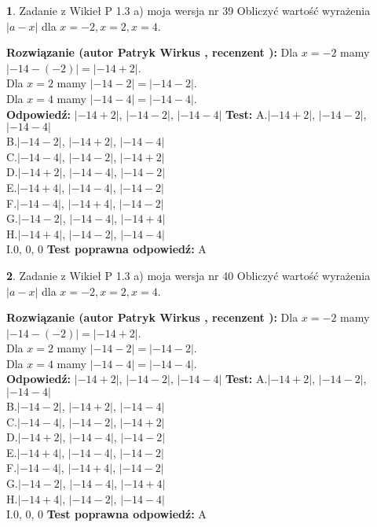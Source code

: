 \documentclass[12pt, a4paper]{article}
\theoremstyle{definition} %
\newtheorem{zad}{}
\newcommand{\zadStart}[1]{\begin{zad}#1\newline}
\newcommand{\zadStop}{\end{zad}}
\newcommand{\rozwStart}[2]{\noindent \textbf{Rozwiązanie (autor #1 , recenzent #2): }\newline}
\newcommand{\rozwStop}{\newline}
\newcommand{\odpStart}{\noindent \textbf{Odpowiedź:}\newline}
\newcommand{\odpStop}{\newline}
\newcommand{\testStart}{\noindent \textbf{Test:}\newline}
\newcommand{\testStop}{\newline}
\newcommand{\kluczStart}{\noindent \textbf{Test poprawna odpowiedź:}\newline}
\newcommand{\kluczStop}{\newline}
\begin{document}
\zadStart{Zadanie z Wikieł P 1.3 a) moja wersja nr 39}
Obliczyć wartość wyrażenia $|a - x|$ dla $x=-2,x=2,x=4$.
\zadStop
\rozwStart{Patryk Wirkus}{}
Dla $x = -2$ mamy $|-14 - (-2)| = |-14 + 2|$.\\
Dla $x = 2$ mamy $|-14 - 2| = |-14 - 2|$.\\
Dla $x = 4$ mamy $|-14 - 4| = |-14 - 4|$.\\
\rozwStop
\odpStart
$|-14 + 2|$, $|-14 - 2|$, $|-14 - 4|$
\odpStop
\testStart
A.$|-14 + 2|$, $|-14 - 2|$, $|-14 - 4|$\\
B.$|-14 - 2|$, $|-14 + 2|$, $|-14 - 4|$\\
C.$|-14 - 4|$, $|-14 - 2|$, $|-14 + 2|$\\
D.$|-14 + 2|$, $|-14 - 4|$, $|-14 - 2|$\\
E.$|-14 + 4|$, $|-14 - 4|$, $|-14 - 2|$\\
F.$|-14 - 4|$, $|-14 + 4|$, $|-14 - 2|$\\
G.$|-14 - 2|$, $|-14 - 4|$, $|-14 + 4|$\\
H.$|-14 + 4|$, $|-14 - 2|$, $|-14 - 4|$\\
I.$0$, $0$, $0$
\testStop
\kluczStart
A
\kluczStop



\zadStart{Zadanie z Wikieł P 1.3 a) moja wersja nr 40}
Obliczyć wartość wyrażenia $|a - x|$ dla $x=-2,x=2,x=4$.
\zadStop
\rozwStart{Patryk Wirkus}{}
Dla $x = -2$ mamy $|-14 - (-2)| = |-14 + 2|$.\\
Dla $x = 2$ mamy $|-14 - 2| = |-14 - 2|$.\\
Dla $x = 4$ mamy $|-14 - 4| = |-14 - 4|$.\\
\rozwStop
\odpStart
$|-14 + 2|$, $|-14 - 2|$, $|-14 - 4|$
\odpStop
\testStart
A.$|-14 + 2|$, $|-14 - 2|$, $|-14 - 4|$\\
B.$|-14 - 2|$, $|-14 + 2|$, $|-14 - 4|$\\
C.$|-14 - 4|$, $|-14 - 2|$, $|-14 + 2|$\\
D.$|-14 + 2|$, $|-14 - 4|$, $|-14 - 2|$\\
E.$|-14 + 4|$, $|-14 - 4|$, $|-14 - 2|$\\
F.$|-14 - 4|$, $|-14 + 4|$, $|-14 - 2|$\\
G.$|-14 - 2|$, $|-14 - 4|$, $|-14 + 4|$\\
H.$|-14 + 4|$, $|-14 - 2|$, $|-14 - 4|$\\
I.$0$, $0$, $0$
\testStop
\kluczStart
A
\kluczStop
\end{document}
